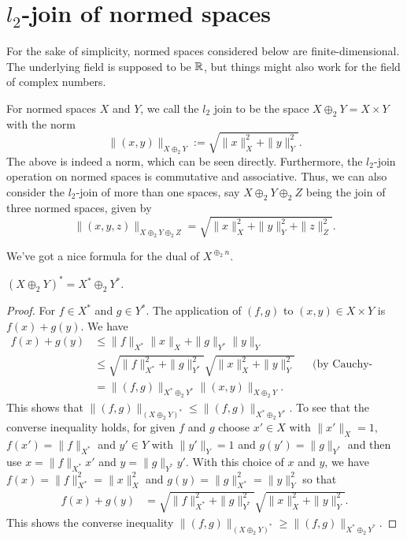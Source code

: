 	
\section{$l_2$-join of normed spaces}

For the sake of simplicity, normed spaces considered below are finite-dimensional. The underlying field is supposed to be $\mathbb{R}$, but things might also work for the field of complex numbers. 

For normed spaces $X$ and $Y$, we call the $l_2$ join to be the space $X \oplus_2 Y = X \times Y$ with the norm 
\[
	\| (x,y) \|_{X \oplus_2 Y} := \sqrt{ \|x\|_X^2 + \|y\|_Y^2}. 
\]
The above is indeed a norm, which can be seen directly. Furthermore, the $l_2$-join operation on normed spaces is commutative and associative. Thus, we can also consider the $l_2$-join of more than one spaces, say $X \oplus_2 Y \oplus_2 Z$ being the join of three normed spaces, given by 
\[
	\|(x,y,z)\|_{X \oplus_2 Y \oplus_2 Z} = \sqrt{\|x\|_X^2 + \|y\|_Y^2 + \|z\|_Z^2}.  
\]

We've got a nice formula for the dual of $X^{\oplus_2 n}$. 
\begin{prop}
	$(X \oplus_2 Y)^\ast = X^\ast \oplus_2 Y^\ast.$ 
\end{prop} 
\begin{proof} 
	For $f \in X^\ast$ and $g \in Y^\ast$. The application of $(f,g)$ to $(x,y) \in X \times Y$ is $f(x) + g(y)$. We have 
	\begin{align*}
		f(x) + g(y)  
			& \le \|f\|_{X^\ast} \|x\|_X + \|g\|_{Y^\ast} \|y\|_Y
		\\&  \le \sqrt{\|f\|_{X^\ast}^2  + \|g\|_{Y^\ast}^2 } \sqrt{\|x\|_X^2 + \|y\|_Y^2} & & \text{(by Cauchy-Schwarz)}
		\\ & = \| (f,g) \|_{X^\ast \oplus_2 Y^\ast} \| (x,y)\|_{X \oplus_2 Y}. 
	\end{align*} 
	This shows that $\|(f,g) \|_{(X \oplus_2 Y)^\ast} \le \|(f,g)\|_{X^\ast \oplus_2 Y^\ast}.$ 
	To see that the converse inequality holds, for given $f$ and $g$ choose $x' \in X$ with $\|x'\|_X = 1$, $f(x') = \|f\|_{X^\ast}$ and $y' \in Y$ with $\|y'\|_Y = 1$ and $g(y') = \|g\|_{Y^\ast}$ and then use $x = \|f\|_{X^\ast} x'$ and $y =\|g\|_{Y^\ast} y'$. With this choice of $x$ and $y$, we have $f(x) = \|f\|_{X^\ast}^2  = \|x\|_X^2$ and $g(y) = \|g\|_{X^\ast}^2 = \|y\|_Y^2$ so that 
	\begin{align*}
		f(x) + g(y) & = \sqrt{ \|f\|_{X^\ast}^2 + \|g\|_{Y^\ast}^2} \sqrt{\|x\|_X^2 + \|y\|_Y^2}. 
	\end{align*} 
	This shows the converse inequality $\|(f,g) \|_{(X \oplus_2 Y)^\ast} \ge \|(f,g)\|_{X^\ast \oplus_2 Y^\ast}.$ 
\end{proof} 

